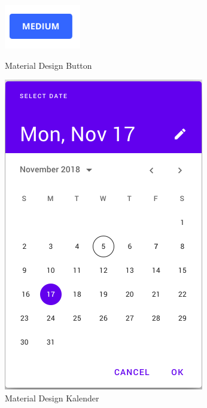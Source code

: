 \begin{figure}[H]
  \begin{minipage}[b]{0.4\textwidth}
    \includegraphics[width=\textwidth]{images/matButton.PNG}
    \caption{Material Design Button}
    \label{fig:matButtom}
  \end{minipage}
  \hfill
  \begin{minipage}[b]{0.4\textwidth}
    \includegraphics[width=\textwidth]{images/matCalendar.PNG}
    \caption{Material Design Kalender}
    \label{fig:matCalendar}
  \end{minipage}
\end{figure}

